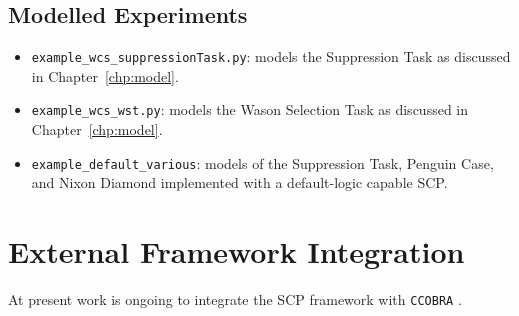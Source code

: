 \subsection{Modelled Experiments}
\begin{itemize}
\item \texttt{example\_wcs\_suppressionTask.py}: models the Suppression Task as discussed in Chapter~\ref{chp:model}.
\item \texttt{example\_wcs\_wst.py}: models the Wason Selection Task as discussed in Chapter~\ref{chp:model}.
\item \texttt{example\_default\_various}: models of the Suppression Task, Penguin Case, and Nixon Diamond implemented with a default-logic capable SCP.
\end{itemize}

\section{External Framework Integration}
At present work is ongoing to integrate the SCP framework with \texttt{CCOBRA} \citep{ccobra}.













